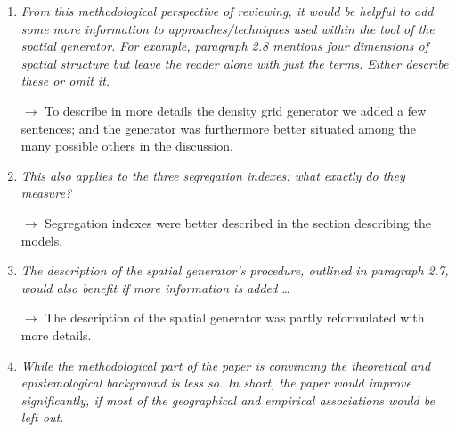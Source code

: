 \documentclass[11pt,a4paper,sans]{moderncv}        %
\begin{document}
\begin{enumerate}
 	\item \textit{From this methodological perspective of reviewing, it would be helpful to add some more information to approaches/techniques used within the tool of the spatial generator. For example, paragraph 2.8 mentions four dimensions of spatial structure but leave the reader alone with just the terms. Either describe these or omit it.}
   
   $\rightarrow$ To describe in more details the density grid generator we added a few sentences; and the generator was furthermore better situated among the many possible others in the discussion.
	  
  \medskip
  
   \item \textit{This also applies to the three segregation indexes: what exactly do they measure?}
  
  $\rightarrow$ Segregation indexes were better described in the section describing the models.
  
  \medskip
  
  \item \textit{The description of the spatial generator’s procedure, outlined in paragraph 2.7, would also benefit if more information is added} \ldots
  
  $\rightarrow$ The description of the spatial generator was partly reformulated with more details.

  \medskip

  \item \textit{While the methodological part of the paper is convincing the theoretical and epistemological background is less so. In short, the paper would improve significantly, if most of the geographical and empirical associations would be left out.}
   

\end{enumerate}
\end{document}
